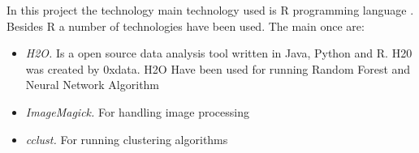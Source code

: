 In this project the technology main technology used is R programming language \cite{RLanguage}.
Besides R a number of technologies have been used. The main once are:
\begin{itemize}
\item \textit{H2O.} Is a open source data analysis tool written in Java, Python and R. H20 was created by 0xdata. H2O Have been used for running Random Forest and Neural Network Algorithm \cite{H2O}
\item \textit{ImageMagick.} For handling image processing \cite{ImgMag}
\item \textit{cclust.} For running clustering algorithms \cite{cclust}
\end{itemize}
